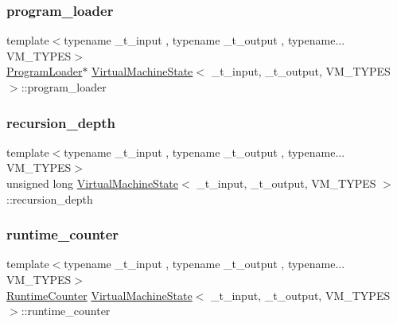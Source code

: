 \mbox{\label{class_virtual_machine_state_ada020ee6e13cbda67c9dfed264f7fc3f}} 
\subsubsection{\texorpdfstring{program\+\_\+loader}{program\_loader}}
{\footnotesize\ttfamily template$<$typename \+\_\+t\+\_\+input , typename \+\_\+t\+\_\+output , typename... V\+M\+\_\+\+T\+Y\+P\+ES$>$ \\
\hyperlink{class_program_loader}{Program\+Loader}$\ast$ \hyperlink{class_virtual_machine_state}{Virtual\+Machine\+State}$<$ \+\_\+t\+\_\+input, \+\_\+t\+\_\+output, V\+M\+\_\+\+T\+Y\+P\+ES $>$\+::program\+\_\+loader}

\mbox{\label{class_virtual_machine_state_aa35593f67d1ea4e838fec8e7a8d33897}} 
\subsubsection{\texorpdfstring{recursion\+\_\+depth}{recursion\_depth}}
{\footnotesize\ttfamily template$<$typename \+\_\+t\+\_\+input , typename \+\_\+t\+\_\+output , typename... V\+M\+\_\+\+T\+Y\+P\+ES$>$ \\
unsigned long \hyperlink{class_virtual_machine_state}{Virtual\+Machine\+State}$<$ \+\_\+t\+\_\+input, \+\_\+t\+\_\+output, V\+M\+\_\+\+T\+Y\+P\+ES $>$\+::recursion\+\_\+depth}

\mbox{\label{class_virtual_machine_state_ad62a688573c8c8187b25731a417e57ac}} 
\subsubsection{\texorpdfstring{runtime\+\_\+counter}{runtime\_counter}}
{\footnotesize\ttfamily template$<$typename \+\_\+t\+\_\+input , typename \+\_\+t\+\_\+output , typename... V\+M\+\_\+\+T\+Y\+P\+ES$>$ \\
\hyperlink{class_runtime_counter}{Runtime\+Counter} \hyperlink{class_virtual_machine_state}{Virtual\+Machine\+State}$<$ \+\_\+t\+\_\+input, \+\_\+t\+\_\+output, V\+M\+\_\+\+T\+Y\+P\+ES $>$\+::runtime\+\_\+counter}

